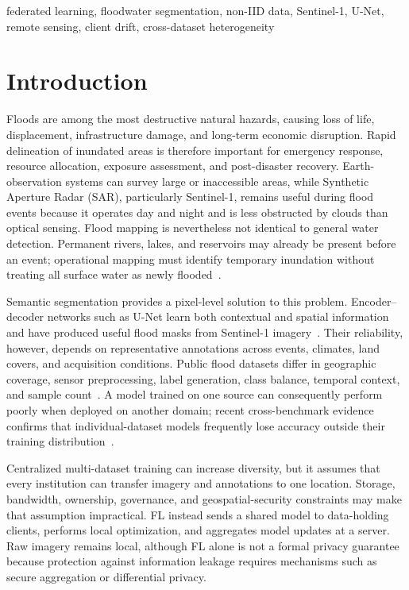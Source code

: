\documentclass[conference]{IEEEtran}
\begin{document}
\begin{IEEEkeywords}
federated learning, floodwater segmentation, non-IID data, Sentinel-1, U-Net, remote sensing, client drift, cross-dataset heterogeneity
\end{IEEEkeywords}

\section{Introduction}
Floods are among the most destructive natural hazards, causing loss of life, displacement, infrastructure damage, and long-term economic disruption. Rapid delineation of inundated areas is therefore important for emergency response, resource allocation, exposure assessment, and post-disaster recovery. Earth-observation systems can survey large or inaccessible areas, while Synthetic Aperture Radar (SAR), particularly Sentinel-1, remains useful during flood events because it operates day and night and is less obstructed by clouds than optical sensing. Flood mapping is nevertheless not identical to general water detection. Permanent rivers, lakes, and reservoirs may already be present before an event; operational mapping must identify temporary inundation without treating all surface water as newly flooded~\cite{bai2021enhancement, bountos2024kuro}.

Semantic segmentation provides a pixel-level solution to this problem. Encoder--decoder networks such as U-Net learn both contextual and spatial information and have produced useful flood masks from Sentinel-1 imagery~\cite{paul2021flood, pechmay2024segmentation}. Their reliability, however, depends on representative annotations across events, climates, land covers, and acquisition conditions. Public flood datasets differ in geographic coverage, sensor preprocessing, label generation, class balance, temporal context, and sample count~\cite{montello2022mmflood, bountos2024kuro, fawakherji2025deepflood}. A model trained on one source can consequently perform poorly when deployed on another domain; recent cross-benchmark evidence confirms that individual-dataset models frequently lose accuracy outside their training distribution~\cite{portalesjulia2025understanding}.

Centralized multi-dataset training can increase diversity, but it assumes that every institution can transfer imagery and annotations to one location. Storage, bandwidth, ownership, governance, and geospatial-security constraints may make that assumption impractical. FL instead sends a shared model to data-holding clients, performs local optimization, and aggregates model updates at a server. Raw imagery remains local, although FL alone is not a formal privacy guarantee because protection against information leakage requires mechanisms such as secure aggregation or differential privacy.
\end{document}
